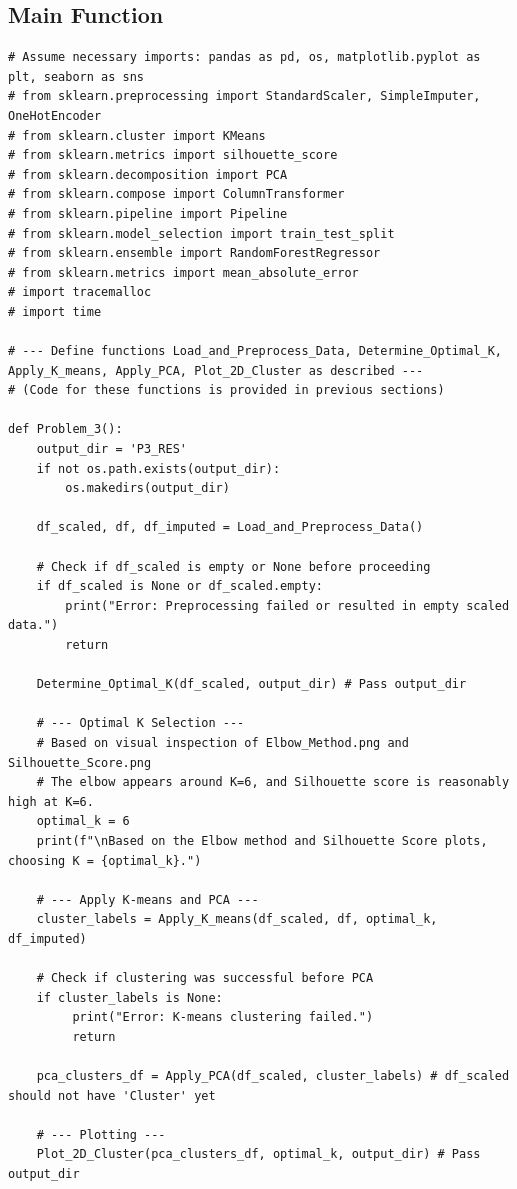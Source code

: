 \documentclass[12pt]{report}
\begin{document}
{{{\subsection{Main Function} %
\begin{lstlisting}
# Assume necessary imports: pandas as pd, os, matplotlib.pyplot as plt, seaborn as sns
# from sklearn.preprocessing import StandardScaler, SimpleImputer, OneHotEncoder
# from sklearn.cluster import KMeans
# from sklearn.metrics import silhouette_score
# from sklearn.decomposition import PCA
# from sklearn.compose import ColumnTransformer
# from sklearn.pipeline import Pipeline
# from sklearn.model_selection import train_test_split
# from sklearn.ensemble import RandomForestRegressor
# from sklearn.metrics import mean_absolute_error
# import tracemalloc
# import time

# --- Define functions Load_and_Preprocess_Data, Determine_Optimal_K, Apply_K_means, Apply_PCA, Plot_2D_Cluster as described ---
# (Code for these functions is provided in previous sections)

def Problem_3():
    output_dir = 'P3_RES'
    if not os.path.exists(output_dir):
        os.makedirs(output_dir)

    df_scaled, df, df_imputed = Load_and_Preprocess_Data()

    # Check if df_scaled is empty or None before proceeding
    if df_scaled is None or df_scaled.empty:
        print("Error: Preprocessing failed or resulted in empty scaled data.")
        return

    Determine_Optimal_K(df_scaled, output_dir) # Pass output_dir

    # --- Optimal K Selection ---
    # Based on visual inspection of Elbow_Method.png and Silhouette_Score.png
    # The elbow appears around K=6, and Silhouette score is reasonably high at K=6.
    optimal_k = 6
    print(f"\nBased on the Elbow method and Silhouette Score plots, choosing K = {optimal_k}.")

    # --- Apply K-means and PCA ---
    cluster_labels = Apply_K_means(df_scaled, df, optimal_k, df_imputed)

    # Check if clustering was successful before PCA
    if cluster_labels is None:
         print("Error: K-means clustering failed.")
         return

    pca_clusters_df = Apply_PCA(df_scaled, cluster_labels) # df_scaled should not have 'Cluster' yet

    # --- Plotting ---
    Plot_2D_Cluster(pca_clusters_df, optimal_k, output_dir) # Pass output_dir


\end{lstlisting}}}}
\end{document}
